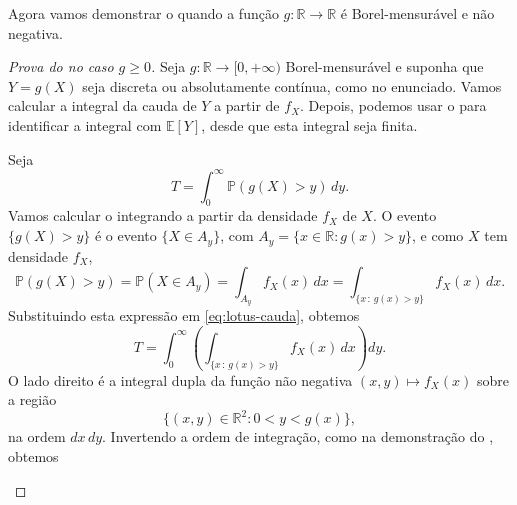 \documentclass[12pt,portuguese]{article}
\theoremstyle{definition}
\theoremstyle{plainexercise}
\theoremstyle{starredexercise}
\theoremstyle{definition}
\begin{document}
Agora vamos demonstrar o  quando a função $g:\mathbb{R}\to\mathbb{R}$
é Borel-mensurável e não negativa.

\begin{proof}[Prova do  no caso $g \geqslant 0$]
Seja $g : \mathbb{R} \to [0, +\infty)$ Borel-mensurável e suponha que
$Y=g(X)$ seja discreta ou absolutamente contínua, como no enunciado.
Vamos calcular a integral da cauda de $Y$ a partir de $f_X$. Depois,
podemos usar o  para identificar a integral com
$\mathbb{E}[Y]$, desde que esta integral seja finita.

Seja
\begin{equation}\label{eq:lotus-cauda}
T=\int_{0}^{\infty} \mathbb{P}(g(X) > y)\,dy.
\end{equation}
Vamos calcular o integrando a partir da densidade $f_X$ de $X$. O
evento $\{g(X) > y\}$ é o evento $\{X \in A_y\}$, com
$A_y = \{x \in \mathbb{R} : g(x) > y\}$, e como $X$ tem densidade
$f_X$,
\[
\mathbb{P}(g(X) > y) 
= \mathbb{P}(X\in A_{y}) 
= \int_{A_y} f_X(x)\,dx
= \int_{\{x \,:\, g(x) > y\}} f_X(x)\,dx.
\]
Substituindo esta expressão em \eqref{eq:lotus-cauda}, obtemos
\[
T
= \int_{0}^{\infty} \left(
\int_{\{x \,:\, g(x) > y\}} f_X(x)\,dx
\right) dy.
\]
O lado direito é a integral dupla da função não negativa 
$(x, y) \longmapsto f_X(x)$
sobre a região
\[
\{(x, y) \in \mathbb{R}^2 : 0 < y < g(x)\},
\]
na ordem $dx\,dy$. Invertendo a ordem de integração, como na
demonstração do , obtemos
\begin{figure}[H]
\centering
{}
\end{figure}
\end{proof}
\end{document}
